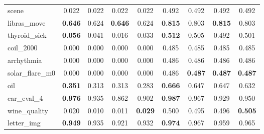 \begin{figure}[ht]
\begin{tabular}{p{22mm}|*4{p{14mm}}|*4{p{14mm}}}
        scene&\multicolumn{1}{c}{0.022}&\multicolumn{1}{c}{0.022}&\multicolumn{1}{c}{0.022}&\multicolumn{1}{c|}{0.022}&\multicolumn{1}{c}{0.492}&\multicolumn{1}{c}{0.492}&\multicolumn{1}{c}{0.492}&\multicolumn{1}{c}{0.492}\\
        libras\_move&\multicolumn{1}{c}{\textbf{0.646}}&\multicolumn{1}{c}{0.624}&\multicolumn{1}{c}{\textbf{0.646}}&\multicolumn{1}{c|}{0.624}&\multicolumn{1}{c}{\textbf{0.815}}&\multicolumn{1}{c}{0.803}&\multicolumn{1}{c}{\textbf{0.815}}&\multicolumn{1}{c}{0.803}\\
        thyroid\_sick&\multicolumn{1}{c}{\textbf{0.056}}&\multicolumn{1}{c}{0.041}&\multicolumn{1}{c}{0.016}&\multicolumn{1}{c|}{0.033}&\multicolumn{1}{c}{\textbf{0.512}}&\multicolumn{1}{c}{0.505}&\multicolumn{1}{c}{0.492}&\multicolumn{1}{c}{0.501}\\
        coil\_2000&\multicolumn{1}{c}{0.000}&\multicolumn{1}{c}{0.000}&\multicolumn{1}{c}{0.000}&\multicolumn{1}{c|}{0.000}&\multicolumn{1}{c}{0.485}&\multicolumn{1}{c}{0.485}&\multicolumn{1}{c}{0.485}&\multicolumn{1}{c}{0.485}\\
        arrhythmia&\multicolumn{1}{c}{0.000}&\multicolumn{1}{c}{0.000}&\multicolumn{1}{c}{0.000}&\multicolumn{1}{c|}{0.000}&\multicolumn{1}{c}{0.486}&\multicolumn{1}{c}{0.486}&\multicolumn{1}{c}{0.486}&\multicolumn{1}{c}{0.486}\\
        solar\_flare\_m0&\multicolumn{1}{c}{0.000}&\multicolumn{1}{c}{0.000}&\multicolumn{1}{c}{0.000}&\multicolumn{1}{c|}{0.000}&\multicolumn{1}{c}{0.486}&\multicolumn{1}{c}{\textbf{0.487}}&\multicolumn{1}{c}{\textbf{0.487}}&\multicolumn{1}{c}{\textbf{0.487}}\\
        oil&\multicolumn{1}{c}{\textbf{0.351}}&\multicolumn{1}{c}{0.313}&\multicolumn{1}{c}{0.313}&\multicolumn{1}{c|}{0.283}&\multicolumn{1}{c}{\textbf{0.666}}&\multicolumn{1}{c}{0.647}&\multicolumn{1}{c}{0.647}&\multicolumn{1}{c}{0.632}\\
        car\_eval\_4&\multicolumn{1}{c}{\textbf{0.976}}&\multicolumn{1}{c}{0.935}&\multicolumn{1}{c}{0.862}&\multicolumn{1}{c|}{0.902}&\multicolumn{1}{c}{\textbf{0.987}}&\multicolumn{1}{c}{0.967}&\multicolumn{1}{c}{0.929}&\multicolumn{1}{c}{0.950}\\
        wine\_quality&\multicolumn{1}{c}{0.020}&\multicolumn{1}{c}{0.010}&\multicolumn{1}{c}{0.011}&\multicolumn{1}{c|}{\textbf{0.029}}&\multicolumn{1}{c}{0.500}&\multicolumn{1}{c}{0.495}&\multicolumn{1}{c}{0.496}&\multicolumn{1}{c}{\textbf{0.505}}\\
        letter\_img&\multicolumn{1}{c}{\textbf{0.949}}&\multicolumn{1}{c}{0.935}&\multicolumn{1}{c}{0.921}&\multicolumn{1}{c|}{0.932}&\multicolumn{1}{c}{\textbf{0.974}}&\multicolumn{1}{c}{0.967}&\multicolumn{1}{c}{0.959}&\multicolumn{1}{c}{0.965}\\

\end{tabular}
\end{figure}
